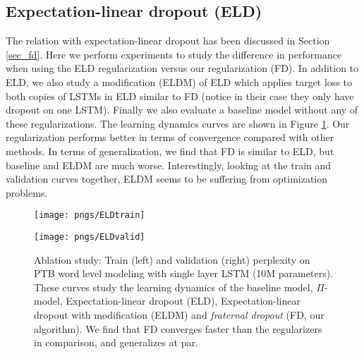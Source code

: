 \documentclass{article} \usepackage{iclr2018_conference,times}
\begin{document}
\subsection{Expectation-linear dropout (ELD)}\label{subsec:eld}

The relation with expectation-linear dropout \cite{ma2016dropout} has been discussed in Section \ref{sec_fd}. Here we perform experiments to study the difference in performance when using the ELD regularization versus our regularization (FD). In addition to ELD, we also study a modification (ELDM) of ELD which applies target loss to both copies of LSTMs in ELD similar to FD (notice in their case they only have dropout on one LSTM). Finally we also evaluate a baseline model without any of these regularizations. The learning dynamics curves are shown in Figure \ref{fig_pi_model}. Our regularization performs better in terms of convergence compared with other methods. In terms of generalization, we find that FD is similar to ELD, but baseline and ELDM are much worse. Interestingly, looking at the train and validation curves together, ELDM seems to be suffering from optimization problems.

\begin{figure}[t]
\vspace{-0.08cm}
  \centering
  \begin{minipage}[b]{0.48\textwidth}
    \texttt{[image: pngs/ELDtrain]}
  \end{minipage}
  \hfill
  \begin{minipage}[b]{0.48\textwidth}
    \texttt{[image: pngs/ELDvalid]}
  \end{minipage}
  \caption{Ablation study: Train (left) and validation (right) perplexity on PTB word level modeling with single layer LSTM (10M parameters). These curves study the learning dynamics of the baseline model, $\Pi$-model, Expectation-linear dropout (ELD), Expectation-linear dropout with modification (ELDM) and \emph{fraternal dropout} (FD, our algorithm). We find that FD converges faster than the regularizers in comparison, and generalizes at par.}
\vspace{-0.08cm}
\label{fig_pi_model}
\end{figure}
\end{document}
